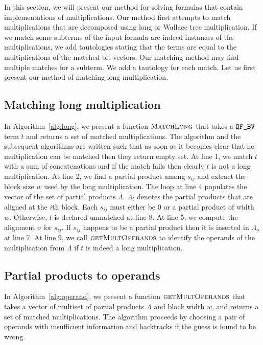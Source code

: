 %
In this section, we will present our method for solving
formulas that contain implementations of multiplications.
%
Our method first attempts to match multiplications that
are decomposed using long or Wallace tree multiplication.
%
If we match some subterms of the input formula
are indeed instances of the
multiplications, we add tautologies stating that the terms are 
equal to the multiplications of the matched bit-vectors.
%
Our matching method may find multiple matches for a subterm.
%
We add a tautology for each match.
%
Let us first present our method of matching long multiplication. 

\subsection{Matching long multiplication}


In Algorithm~\ref{alg:long}, we present a function $\textsc{MatchLong}$
that takes a $\texttt{QF\_BV}$ term $t$ and returns a set of matched multiplications.
%
The algorithm and the subsequent algorithms are written such that as soon
as it becomes clear that no multiplication can be matched then
they return empty set. 
%
At line 1, we match $t$ with a sum of concatenations and if the match fails
then clearly $t$ is not a long multiplication.
%
At line 2, we find a partial product among $s_{ij}$ and extract
the block size $w$ used by the long multiplication.
%
The loop at line $4$ populates the vector of the set of partial products $\Lambda$.
%
$\Lambda_i$ denotes the partial products that are aligned at the $i$th block.
%
Each $s_{ij}$ must either be $0$ or a partial product of width $w$.
%
Otherwise, $t$ is declared unmatched at line 8. 
%
At line 5, we compute the alignment $o$ for $s_{ij}$.
%
If $s_{ij}$ happens to be a partial product then it is inserted in
$\Lambda_o$ at line 7.
%
At line 9, we call $\textsc{getMultOperands}$ to identify the operands
of the multiplication from $\Lambda$ if $t$ is indeed a long
multiplication.

\subsection{Partial products to operands}


In Algorithm~\ref{alg:operand}, we present a function
$\textsc{getMultOperands}$ that takes a vector of multiset of partial
products $\Lambda$ and block width $w$, and returns a set of matched
multiplications.
%
The algorithm proceeds by choosing a pair of operands with
insufficient information and backtracks if the guess is found to be
wrong.


